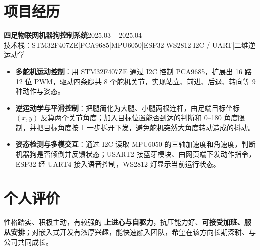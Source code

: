 \documentclass[10pt,a4paper]{article}
\newcommand{\projectblock}[3]{%
    {\bfseries\color{darktext}#1}\hfill{\color{graytext}#2}\\%
    {\small\color{graytext}#3}%
    \vspace{0.15em}%
}
\begin{document}
\vspace{0.2em}

\section{\faProjectDiagram\hspace{0.4em}项目经历}

\projectblock{四足物联网机器狗控制系统}{2025.03 -- 2025.04}{技术栈：STM32F407ZE\hspace{0.3em}|\hspace{0.3em}PCA9685\hspace{0.3em}|\hspace{0.3em}MPU6050\hspace{0.3em}|\hspace{0.3em}ESP32\hspace{0.3em}|\hspace{0.3em}WS2812\hspace{0.3em}|\hspace{0.3em}I2C / UART\hspace{0.3em}|\hspace{0.3em}二维逆运动学}

\begin{itemize}[leftmargin=1.5em, itemsep=1pt, parsep=0pt, topsep=2pt]
    \item \textbf{多舵机运动控制}：用 STM32F407ZE 通过 I2C 控制 PCA9685，扩展出 16 路 12 位 PWM，驱动四条腿共 8 个舵机关节，实现站立、前进、后退、转向等 9 种动作与姿态。
    \item \textbf{逆运动学与平滑控制}：把腿简化为大腿、小腿两根连杆，由足端目标坐标 $(x, y)$ 反算两个关节角度；加入目标位置能否到达的判断和 0\textdegree--180\textdegree{} 角度限制，并把目标角度按 1\textdegree{} 一步拆开下发，避免舵机突然大角度转动造成的抖动。
    \item \textbf{姿态检测与多模交互}：通过 I2C 读取 MPU6050 的三轴加速度和角速度，判断机器狗是否倾倒并反馈状态；USART2 接蓝牙模块、由网页端下发动作指令，ESP32 经 UART4 接入语音控制，WS2812 灯显示当前运行状态。
\end{itemize}

\vspace{0.15em}

\section{\faUser\hspace{0.4em}个人评价}

性格踏实、积极主动，有较强的 \textbf{上进心与自驱力}，抗压能力好、\textbf{可接受加班、服从安排}；对嵌入式开发有浓厚兴趣，能快速融入团队，希望在该方向长期深耕、与公司共同成长。
\end{document}

